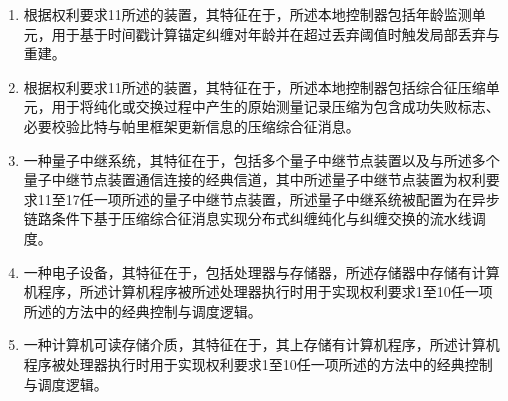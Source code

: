 \documentclass[12pt,a4paper]{article}
\begin{document}
\begin{enumerate}[label=\arabic*.,leftmargin=2em,itemsep=0.6em]
    \item 根据权利要求11所述的装置，其特征在于，所述本地控制器包括年龄监测单元，用于基于时间戳计算锚定纠缠对年龄并在超过丢弃阈值时触发局部丢弃与重建。

    \item 根据权利要求11所述的装置，其特征在于，所述本地控制器包括综合征压缩单元，用于将纯化或交换过程中产生的原始测量记录压缩为包含成功失败标志、必要校验比特与帕里框架更新信息的压缩综合征消息。

    \item 一种量子中继系统，其特征在于，包括多个量子中继节点装置以及与所述多个量子中继节点装置通信连接的经典信道，其中所述量子中继节点装置为权利要求11至17任一项所述的量子中继节点装置，所述量子中继系统被配置为在异步链路条件下基于压缩综合征消息实现分布式纠缠纯化与纠缠交换的流水线调度。

    \item 一种电子设备，其特征在于，包括处理器与存储器，所述存储器中存储有计算机程序，所述计算机程序被所述处理器执行时用于实现权利要求1至10任一项所述的方法中的经典控制与调度逻辑。

    \item 一种计算机可读存储介质，其特征在于，其上存储有计算机程序，所述计算机程序被处理器执行时用于实现权利要求1至10任一项所述的方法中的经典控制与调度逻辑。
\end{enumerate}
\end{document}
